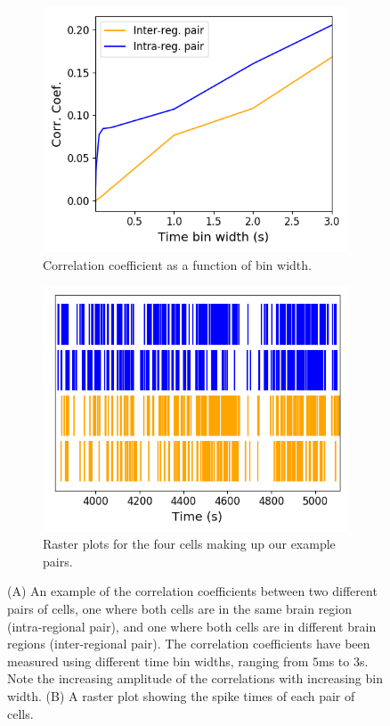     \begin{figure}[h]
      \begin{subfigure}[h]{0.5\linewidth}
        \includegraphics[width=\linewidth]{figures/eight_probe/pairs_correlation.png}
        \caption{Correlation coefficient as a function of bin width.}
        \label{fig:pair_example_correlations}
      \end{subfigure}
      \begin{subfigure}[h]{0.5\linewidth}
        \includegraphics[width=\linewidth]{figures/eight_probe/pairs_raster.png}
        \caption{Raster plots for the four cells making up our example pairs.}
        \label{fig:pair_example_raster}
      \end{subfigure}
      \caption{(A) An example of the correlation coefficients between two different pairs of cells, one where both cells are in the same brain region (intra-regional pair), and one where both cells are in different brain regions (inter-regional pair). The correlation coefficients have been measured using different time bin widths, ranging from $5$ms to $3$s. Note the increasing amplitude of the correlations with increasing bin width. (B) A raster plot showing the spike times of each pair of cells.}
      \label{fig:pair_example}
    \end{figure}


